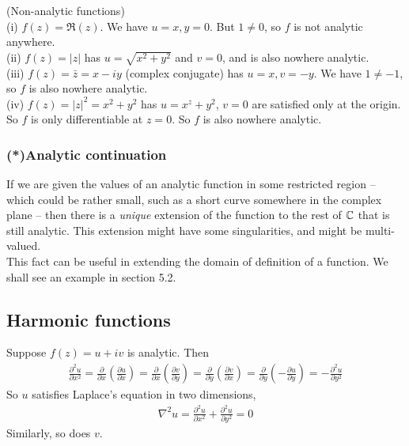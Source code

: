 \documentclass[a4paper]{article}
\begin{document}
\begin{eg} (Non-analytic functions)\\
(i) $f(z) = \Re(z)$. We have $u=x,y=0$. But $1 \neq 0$, so $f$ is not analytic anywhere.\\
(ii) $f(z) = |z|$ has $u=\sqrt{x^2+y^2}$ and $v=0$, and is also nowhere analytic.\\
(iii) $f(z) = \bar{z} = x-iy$ (complex conjugate) has $u=x, v=-y$. We have $1 \neq -1$, so $f$ is also nowhere analytic.\\
(iv) $f(z) = |z|^2 = x^2+y^2$ has $u=x^z+y^2$, $v=0$ are satisfied only at the origin. So $f$ is only differentiable at $z=0$. So $f$ is also nowhere analytic.
\end{eg}

\subsubsection{(*)Analytic continuation}
If we are given the values of an analytic function in some restricted region -- which could be rather small, such as a short curve somewhere in the complex plane -- then there is a \emph{unique} extension of the function to the rest of $\mathbb{C}$ that is still analytic. This extension might have some singularities, and might be multi-valued.\\
This fact can be useful in extending the domain of definition of a function. We shall see an example in section 5.2.

\subsection{Harmonic functions}
Suppose $f(z) = u+iv$ is analytic. Then
\begin{equation*}
\begin{aligned}
\frac{\partial^2 u}{\partial x^2} = \frac{\partial}{\partial x}(\frac{\partial u}{\partial x}) = \frac{\partial}{\partial x}(\frac{\partial v}{\partial y}) = \frac{\partial}{\partial y}(\frac{\partial v}{\partial x}) = \frac{\partial}{\partial y}(-\frac{\partial u}{\partial y}) = -\frac{\partial^2 u}{\partial y^2}
\end{aligned}
\end{equation*}
So $u$ satisfies Laplace's equation in two dimensions,
\begin{equation*}
\begin{aligned}
\nabla^2 u = \frac{\partial^2 u}{\partial x^2} + \frac{\partial^2 u}{\partial y^2} = 0
\end{aligned}
\end{equation*}
Similarly, so does $v$.
\end{document}

